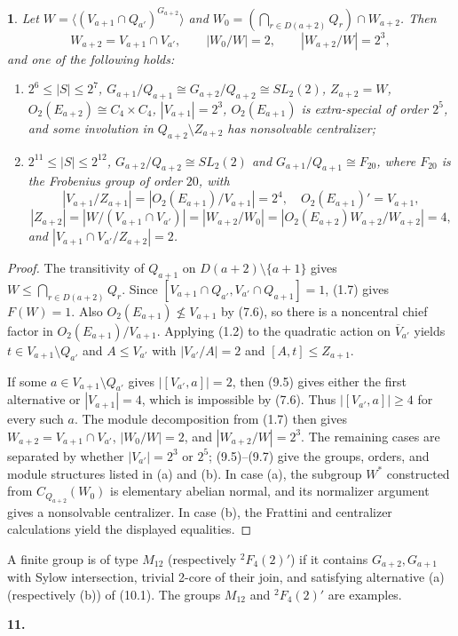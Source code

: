 \documentclass[11pt]{article}
\theoremstyle{plain}
\theoremstyle{stmplain}
\newtheorem{stm}{}[section]
\newcommand{\sect}[1]{\stepcounter{section}\par\vspace{14pt}%
  \begin{center}\textbf{#1.}\end{center}\vspace{2pt}}
\begin{document}
\begin{stm}\label{st:10.1}
Let
$W=\langle(V_{a+1}\cap Q_{a'})^{G_{a+2}}\rangle$ and
$W_0=(\bigcap_{r\in D(a+2)}Q_r)\cap W_{a+2}$. Then
\[
 W_{a+2}=V_{a+1}\cap V_{a'},\qquad
 |W_0/W|=2,\qquad |W_{a+2}/W|=2^3 ,
\]
and one of the following holds:
\begin{enumerate}
\item[(a)] $2^6\le |S|\le2^7$,
  $G_{a+1}/Q_{a+1}\cong G_{a+2}/Q_{a+2}\cong SL_2(2)$,
  $Z_{a+2}=W$, $O_2(E_{a+2})\cong C_4\times C_4$,
  $|V_{a+1}|=2^3$, $O_2(E_{a+1})$ is extra-special of order $2^5$,
  and some involution in $Q_{a+2}\setminus Z_{a+2}$ has nonsolvable
  centralizer;
\item[(b)] $2^{11}\le |S|\le2^{12}$,
  $G_{a+2}/Q_{a+2}\cong SL_2(2)$ and
  $G_{a+1}/Q_{a+1}\cong F_{20}$, where $F_{20}$ is the Frobenius group
  of order $20$, with
  \[
  |V_{a+1}/Z_{a+1}|=|O_2(E_{a+1})/V_{a+1}|=2^4,\quad
  O_2(E_{a+1})'=V_{a+1},
  \]
  \[
  |Z_{a+2}|=|W/(V_{a+1}\cap V_{a'})|
  =|W_{a+2}/W_0|=|O_2(E_{a+2})W_{a+2}/W_{a+2}|=4,
  \]
  and $|V_{a+1}\cap V_{a'}/Z_{a+2}|=2$.
\end{enumerate}
\end{stm}

\begin{proof}
The transitivity of $Q_{a+1}$ on $D(a+2)\setminus\{a+1\}$ gives
$W\le\bigcap_{r\in D(a+2)}Q_r$. Since
$[V_{a+1}\cap Q_{a'},V_{a'}\cap Q_{a+1}]=1$, (1.7) gives
$F(W)=1$. Also $O_2(E_{a+1})\nleq V_{a+1}$ by (7.6), so there is a
noncentral chief factor in $O_2(E_{a+1})/V_{a+1}$. Applying (1.2) to
the quadratic action on $\overline V_{a'}$ yields
$t\in V_{a+1}\setminus Q_{a'}$ and $A\le V_{a'}$ with
$|V_{a'}/A|=2$ and $[A,t]\le Z_{a+1}$.

If some $a\in V_{a+1}\setminus Q_{a'}$ gives
$|[V_{a'},a]|=2$, then (9.5) gives either the first alternative or
$|V_{a+1}|=4$, which is impossible by (7.6). Thus
$|[V_{a'},a]|\ge4$ for every such $a$. The module decomposition from
(1.7) then gives
$W_{a+2}=V_{a+1}\cap V_{a'}$, $|W_0/W|=2$, and
$|W_{a+2}/W|=2^3$. The remaining cases are separated by whether
$|V_{a'}|=2^3$ or $2^5$; (9.5)--(9.7) give the groups, orders, and
module structures listed in (a) and (b). In case (a), the subgroup
$W^*$ constructed from $C_{Q_{a+2}}(W_0)$ is elementary abelian normal,
and its normalizer argument gives a nonsolvable centralizer. In case (b),
the Frattini and centralizer calculations yield the displayed equalities.
\end{proof}

\noindent A finite group is of type $M_{12}$ (respectively $^2F_4(2)'$)
if it contains $G_{a+2},G_{a+1}$ with Sylow intersection, trivial
2-core of their join, and satisfying alternative (a) (respectively (b))
of (10.1). The groups $M_{12}$ and $^2F_4(2)'$ are examples.
\sect{11}
\end{document}
